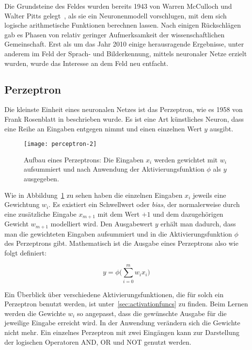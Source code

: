 Die Grundsteine des Feldes wurden bereits 1943 von Warren McCulloch und Walter Pitts gelegt~\cite{mcculloch1943logical}, 
als sie ein Neuronenmodell vorschlugen, mit dem sich logische arithmetische Funktionen berechnen lassen. 
Nach einigen Rückschlägen gab es Phasen von relativ geringer Aufmerksamkeit der wissenschaftlichen Gemeinschaft. 
Erst als um das Jahr 2010 einige herausragende Ergebnisse, unter anderem im Feld der Sprach- und Bilderkennung, 
mittels neuronaler Netze erzielt wurden, wurde das Interesse an dem Feld neu entfacht. 



\subsection{Perzeptron}
Die kleinste Einheit eines neuronalen Netzes ist das Perzeptron, wie es 1958 von Frank Rosenblatt in \cite{rosenblatt1958perceptron} beschrieben wurde.
Es ist eine Art künstliches Neuron, dass eine Reihe an Eingaben entgegen nimmt und einen einzelnen Wert \(y\) ausgibt.

\begin{figure}[h]
    \centering
	\texttt{[image: perceptron-2]}
	\caption[Schematischer Aufbau Perzeptron]{Aufbau eines Perzeptrons: Die Eingaben $x_i$ werden gewichtet mit $w_i$ aufsummiert und nach Anwendung der Aktivierungsfunktion $\phi$ als $y$ ausgegeben.}
	\label{fig:singleNeuron}
\end{figure}

Wie in Abbildung~\ref{fig:singleNeuron} zu sehen haben die einzelnen Eingaben \(x_i\) jeweils eine Gewichtung \(w_i\).
Es existiert ein Schwellwert oder \textit{bias}, der normalerweise 
durch eine zusätzliche Eingabe \(x_{m+1}\) mit dem Wert \(+1\) und dem dazugehörigen Gewicht \(w_{m+1}\) modelliert wird.
Den Ausgabewert \(y\) erhält man dadurch, dass man die gewichteten Eingaben aufsummiert und in die Aktivierungsfunktion \( \phi \) des Perzeptrons gibt.
Mathematisch ist die Ausgabe eines Perzeptrons also wie folgt definiert:

\begin{equation}
	y = \phi \Big( \sum_{i= 0}^{m} w_i x_i \Big)
\end{equation}

Ein Überblick über verschiedene Aktivierungsfunktionen, die für solch ein Perzeptron benutzt werden, ist unter~\ref{sec:activationfuncs} zu finden.
Beim Lernen werden die Gewichte \(w_i\) so angepasst, dass die gewünschte Ausgabe für die jeweilige Eingabe erreicht wird.
In der Anwendung verändern sich die Gewichte nicht mehr.
Ein einzelnes Perzeptron mit zwei Eingängen kann zur Darstellung der logischen Operatoren AND, OR und NOT genutzt werden.

